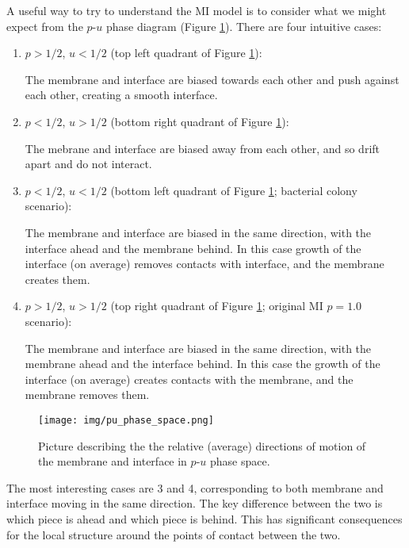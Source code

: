\documentclass[a4paper,10pt]{article}
\newcommand{\fref}[1]{Figure \ref{#1}}
\begin{document}
A useful way to try to understand the MI model is to consider what we might expect from the $p$-$u$ phase diagram (\fref{fig:pu_pd}). There are four intuitive cases:
\begin{enumerate}
 \item $p > 1/2$, $u < 1/2$ (top left quadrant of \fref{fig:pu_pd}): \newline
 
       The membrane and interface are biased towards each other and push against each other, creating a smooth interface.
       
 \item $p < 1/2$, $u > 1/2$ (bottom right quadrant of \fref{fig:pu_pd}): \newline
 
       The mebrane and interface are biased away from each other, and so drift apart and do not interact.
       
 \item $p < 1/2$, $u < 1/2$ (bottom left quadrant of \fref{fig:pu_pd}; bacterial colony scenario): \newline
 
       The membrane and interface are biased in the same direction, with the interface ahead and the membrane behind. In this case growth of the interface (on average) removes contacts with interface, and the membrane creates them.
       
 \item $ p > 1/2$, $u > 1/2$ (top right quadrant of \fref{fig:pu_pd}; original MI $p=1.0$ scenario): \newline
 
       The membrane and interface are biased in the same direction, with the membrane ahead and the interface behind. In this case the growth of the interface (on average) creates contacts with the membrane, and the membrane removes them.
\end{enumerate}
\begin{figure}[h!]
  \centering
  \texttt{[image: img/pu\_phase\_space.png]}
  \caption{Picture describing the the relative (average) directions of motion of the membrane and interface in $p$-$u$ phase space.}
  \label{fig:pu_pd}
\end{figure}

The most interesting cases are 3 and 4, corresponding to both membrane and interface moving in the same direction. The key difference between the two is which piece is ahead and which piece is behind. This has significant consequences for the local structure around the points of contact between the two. 
\end{document}
